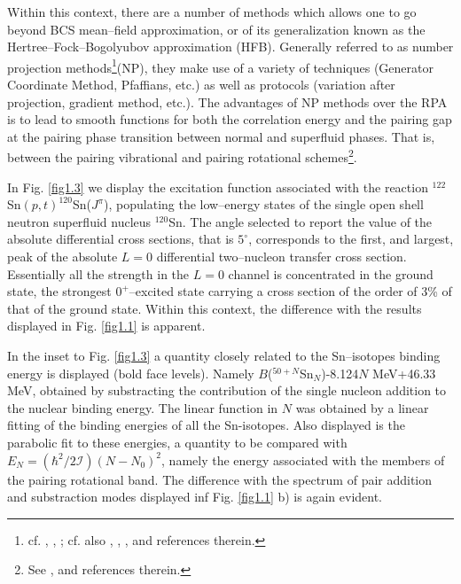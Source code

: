   
  Within this context, there are a number of methods which allows one to go beyond BCS mean--field approximation, or of its generalization known as the Hertree--Fock--Bogolyubov approximation (HFB). Generally referred to as number projection methods\footnote{cf. \cite{Ring:80}, \cite{Egido:13}, \cite{Robledo:13}; cf. also \cite{Frauendorf:13}, \cite{Ring:13}, \cite{Heenen:13}, and references therein.}(NP), they make use of a variety of techniques (Generator Coordinate Method, Pfaffians, etc.) as well as protocols (variation after projection, gradient method, etc.). The advantages of NP methods over the RPA is to lead to smooth functions for both the correlation energy and the pairing gap at the pairing phase transition between normal and superfluid phases. That is, between the pairing vibrational and pairing rotational schemes\footnote{See \cite{Bes:66}, \cite{Bohr:75} and references therein.}.
  
  In Fig. \ref{fig1.3} we display the excitation function associated with the reaction $^{122}$Sn$(p,t)^{120}$Sn($J^\pi$), populating the low--energy states of the single open shell neutron superfluid nucleus $^{120}$Sn. The angle selected to report the value of the absolute differential cross sections, that is $5^\circ$, corresponds to the first, and largest, peak of the absolute $L=0$ differential two--nucleon transfer cross section. Essentially all the strength in the $L=0$ channel is concentrated in the ground state, the strongest $0^+$--excited state carrying a cross section of the order of 3\% of that of the ground state. Within this context, the difference with the results displayed in Fig. \ref{fig1.1} is apparent.
  
  In the inset to Fig. \ref{fig1.3} a quantity closely related to the Sn--isotopes binding energy is displayed (bold face levels). Namely $B$($^{50+N}$Sn$_N$)-8.124$N$ MeV+46.33 MeV, obtained by substracting the contribution of the single nucleon addition to the nuclear binding energy. The linear function in $N$ was obtained by a linear fitting of the binding energies of all the Sn-isotopes. 
  Also displayed is the parabolic fit to these energies, a quantity to be compared with $E_N=(\hbar^2/2\mathcal I)(N-N_0)^2$, namely the energy associated with the members of the pairing rotational band. The difference with the spectrum of pair addition and substraction modes displayed inf Fig. \ref{fig1.1} b) is again evident.
  

